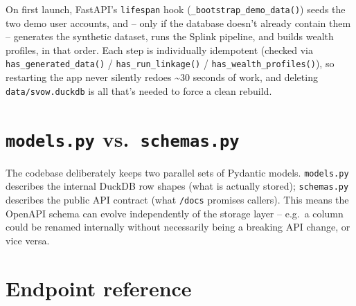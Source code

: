 \documentclass[11pt]{report}
\newcommand{\code}[1]{\lstinline[style=plain]!#1!}
\begin{document}
On first launch, FastAPI's \code{lifespan} hook (\code{_bootstrap_demo_data()}) seeds the two demo user accounts, and -- only if the database doesn't already contain them -- generates the synthetic dataset, runs the Splink pipeline, and builds wealth profiles, in that order. Each step is individually idempotent (checked via \code{has_generated_data()} / \code{has_run_linkage()} / \code{has_wealth_profiles()}), so restarting the app never silently redoes \textasciitilde30 seconds of work, and deleting \texttt{data/svow.duckdb} is all that's needed to force a clean rebuild.

\section{\texttt{models.py} vs.\ \texttt{schemas.py}}

\begin{engbox}
The codebase deliberately keeps two parallel sets of Pydantic models. \texttt{models.py} describes the internal DuckDB row shapes (what is actually stored); \texttt{schemas.py} describes the public API contract (what \texttt{/docs} promises callers). This means the OpenAPI schema can evolve independently of the storage layer -- e.g.\ a column could be renamed internally without necessarily being a breaking API change, or vice versa.
\end{engbox}

\section{Endpoint reference}
\end{document}
